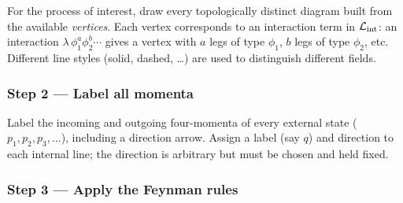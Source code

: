 \documentclass[../main.tex]{subfiles}
\begin{document}
For the process of interest, draw every topologically distinct diagram built from the available \emph{vertices}.  Each vertex corresponds to an interaction term in $\mathcal{L}_{\mathrm{int}}$: an interaction $\lambda\,\phi_1^{a}\phi_2^{b}\cdots$ gives a vertex with $a$ legs of type $\phi_1$, $b$ legs of type $\phi_2$, etc.  Different line styles (solid, dashed, \ldots) are used to distinguish different fields.

\subsubsection*{Step 2 — Label all momenta}

Label the incoming and outgoing four-momenta of every external state ($p_1, p_2, p_3, \ldots$), including a direction arrow.  Assign a label (say $q$) and direction to each internal line; the direction is arbitrary but must be chosen and held fixed.

\subsubsection*{Step 3 — Apply the Feynman rules}

\end{document}
